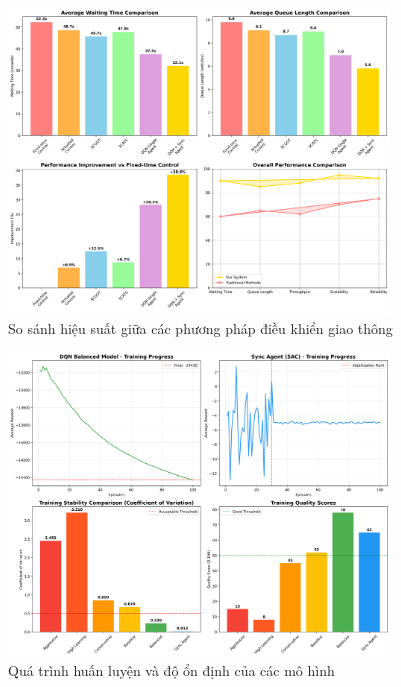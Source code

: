 \begin{figure}[htbp]
    \centering
    \includegraphics[width=0.9\textwidth]{figures/fig_performance_comparison.png}
    \caption{So sánh hiệu suất giữa các phương pháp điều khiển giao thông}
    \label{fig:performance_comparison}
\end{figure}

\begin{figure}[htbp]
    \centering
    \includegraphics[width=0.9\textwidth]{figures/fig_training_progress.png}
    \caption{Quá trình huấn luyện và độ ổn định của các mô hình}
    \label{fig:training_progress}
\end{figure}

